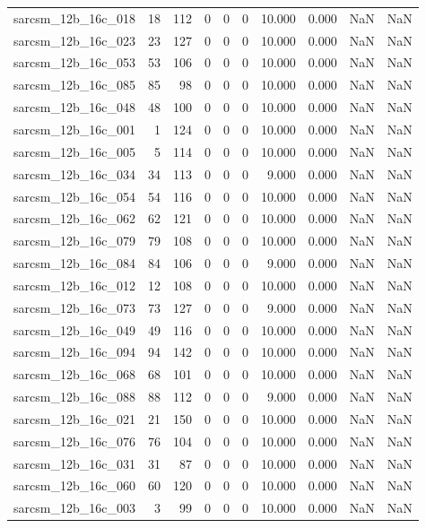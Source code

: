 \documentclass{article}
\begin{document}
\begin{longtable}{lrrrrrrrrr}
sarcsm\_12b\_16c\_018 & 18 & 112 & 0 & 0 & 0 & 10.000 & 0.000 & NaN & NaN \\
sarcsm\_12b\_16c\_023 & 23 & 127 & 0 & 0 & 0 & 10.000 & 0.000 & NaN & NaN \\
sarcsm\_12b\_16c\_053 & 53 & 106 & 0 & 0 & 0 & 10.000 & 0.000 & NaN & NaN \\
sarcsm\_12b\_16c\_085 & 85 & 98 & 0 & 0 & 0 & 10.000 & 0.000 & NaN & NaN \\
sarcsm\_12b\_16c\_048 & 48 & 100 & 0 & 0 & 0 & 10.000 & 0.000 & NaN & NaN \\
sarcsm\_12b\_16c\_001 & 1 & 124 & 0 & 0 & 0 & 10.000 & 0.000 & NaN & NaN \\
sarcsm\_12b\_16c\_005 & 5 & 114 & 0 & 0 & 0 & 10.000 & 0.000 & NaN & NaN \\
sarcsm\_12b\_16c\_034 & 34 & 113 & 0 & 0 & 0 & 9.000 & 0.000 & NaN & NaN \\
sarcsm\_12b\_16c\_054 & 54 & 116 & 0 & 0 & 0 & 10.000 & 0.000 & NaN & NaN \\
sarcsm\_12b\_16c\_062 & 62 & 121 & 0 & 0 & 0 & 10.000 & 0.000 & NaN & NaN \\
sarcsm\_12b\_16c\_079 & 79 & 108 & 0 & 0 & 0 & 10.000 & 0.000 & NaN & NaN \\
sarcsm\_12b\_16c\_084 & 84 & 106 & 0 & 0 & 0 & 9.000 & 0.000 & NaN & NaN \\
sarcsm\_12b\_16c\_012 & 12 & 108 & 0 & 0 & 0 & 10.000 & 0.000 & NaN & NaN \\
sarcsm\_12b\_16c\_073 & 73 & 127 & 0 & 0 & 0 & 9.000 & 0.000 & NaN & NaN \\
sarcsm\_12b\_16c\_049 & 49 & 116 & 0 & 0 & 0 & 10.000 & 0.000 & NaN & NaN \\
sarcsm\_12b\_16c\_094 & 94 & 142 & 0 & 0 & 0 & 10.000 & 0.000 & NaN & NaN \\
sarcsm\_12b\_16c\_068 & 68 & 101 & 0 & 0 & 0 & 10.000 & 0.000 & NaN & NaN \\
sarcsm\_12b\_16c\_088 & 88 & 112 & 0 & 0 & 0 & 9.000 & 0.000 & NaN & NaN \\
sarcsm\_12b\_16c\_021 & 21 & 150 & 0 & 0 & 0 & 10.000 & 0.000 & NaN & NaN \\
sarcsm\_12b\_16c\_076 & 76 & 104 & 0 & 0 & 0 & 10.000 & 0.000 & NaN & NaN \\
sarcsm\_12b\_16c\_031 & 31 & 87 & 0 & 0 & 0 & 10.000 & 0.000 & NaN & NaN \\
sarcsm\_12b\_16c\_060 & 60 & 120 & 0 & 0 & 0 & 10.000 & 0.000 & NaN & NaN \\
sarcsm\_12b\_16c\_003 & 3 & 99 & 0 & 0 & 0 & 10.000 & 0.000 & NaN & NaN \\

\end{longtable}
\end{document}
